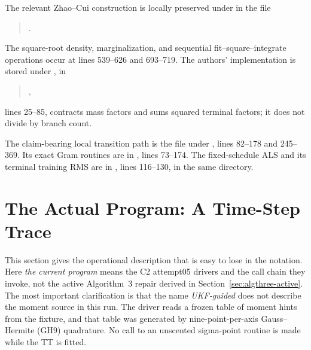 \documentclass[11pt]{article}
\begin{document}
The relevant Zhao--Cui construction is locally preserved under
 in the file
\begin{quote}\small
{}.
\end{quote}
The square-root density, marginalization, and sequential fit--square--integrate
operations occur at lines 539--626 and 693--719. The authors' implementation is
stored under , in
\begin{quote}\small
{},
\end{quote}
lines 25--85, contracts mass factors and sums squared terminal factors; it does
not divide by branch count.

The claim-bearing local transition path is the file
 under
, lines 82--178 and 245--369. Its exact Gram
routines are in , lines 73--174. The
fixed-schedule ALS and its terminal training RMS are in
, lines 116--130, in the same directory.

\section{The Actual Program: A Time-Step Trace}
\label{sec:actual-program}

This section gives the operational description that is easy to lose in the
notation.  Here \emph{the current program} means the C2 attempt05 drivers and
the call chain they invoke, not the active Algorithm~3 repair derived in
Section~\ref{sec:algthree-active}.  The most important clarification is that
the name \emph{UKF-guided} does not describe the moment source in this run.
The driver reads a frozen table of moment hints from the fixture, and that
table was generated by nine-point-per-axis Gauss--Hermite (GH9) quadrature.
No call to an unscented sigma-point routine is made while the TT is fitted.
\end{document}
